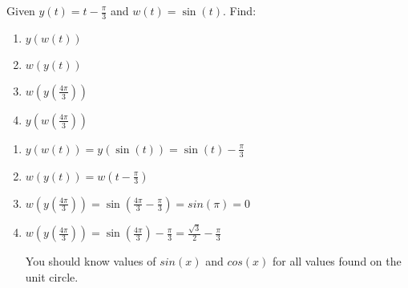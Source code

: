 \documentclass[noinstructornotes]{ximera}
\begin{document}
\begin{instructorNotes}

\end{instructorNotes}



\begin{problem}
Given $y(t)=t- \frac{\pi}{3}$ and $w(t)=\sin(t)$.  Find:
\begin{enumerate}	
	\item  $y(w(t))$
	
	\item  $w(y(t))$


	\item  $w \left(y \left(\frac{4\pi}{3} \right)\right)$


	\item  $y(w(\frac{4\pi}{3}))$
	
	\end{enumerate}
	
	\begin{freeResponse}
		\begin{enumerate}
		
		\item $y(w(t))=y\left( \sin(t) \right)=\sin(t)-\frac{\pi}{3}$
		
		
		\item  $w(y(t))=w\left( t-\frac{\pi}{3}\right)$

		\item $w \left(y \left(\frac{4\pi}{3} \right)\right)=\sin \left(\frac{4\pi}{3}-\frac{\pi}{3}\right)=sin(\pi)=0$

		\item $w \left(y \left(\frac{4\pi}{3} \right)\right)=\sin \left(\frac{4\pi}{3}\right)-\frac{\pi}{3}=\frac{\sqrt{3}}{2}-\frac{\pi}{3}$

		You should know values of $sin(x)$ and $cos(x)$ for all values found on the unit circle.
		
		\end{enumerate}
	\end{freeResponse}
	
\end{problem}

\begin{instructorNotes}

\end{instructorNotes}
\end{document}
